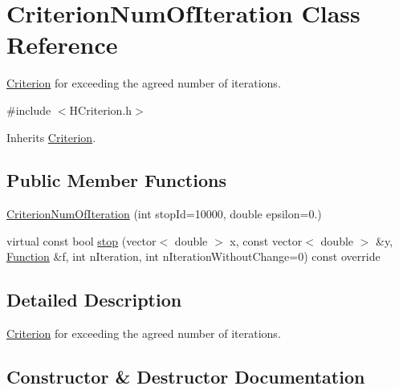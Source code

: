 \hypertarget{class_criterion_num_of_iteration}{}\section{Criterion\+Num\+Of\+Iteration Class Reference}
\label{class_criterion_num_of_iteration}


\hyperlink{class_criterion}{Criterion} for exceeding the agreed number of iterations.  




{\ttfamily \#include $<$H\+Criterion.\+h$>$}



Inherits \hyperlink{class_criterion}{Criterion}.

\subsection*{Public Member Functions}
\begin{DoxyCompactItemize}
\item 
\hyperlink{class_criterion_num_of_iteration_ad786238f8e3439d65ab8b501865be980}{Criterion\+Num\+Of\+Iteration} (int stop\+Id=10000, double epsilon=0.)
\item 
virtual const bool \hyperlink{class_criterion_num_of_iteration_a9885d8e39da442c5ac1049e0546ffdfd}{stop} (vector$<$ double $>$ x, const vector$<$ double $>$ \&y, \hyperlink{class_function}{Function} \&f, int n\+Iteration, int n\+Iteration\+Without\+Change=0) const override
\end{DoxyCompactItemize}


\subsection{Detailed Description}
\hyperlink{class_criterion}{Criterion} for exceeding the agreed number of iterations. 

\subsection{Constructor \& Destructor Documentation}
\mbox{\label{class_criterion_num_of_iteration_ad786238f8e3439d65ab8b501865be980}} 
